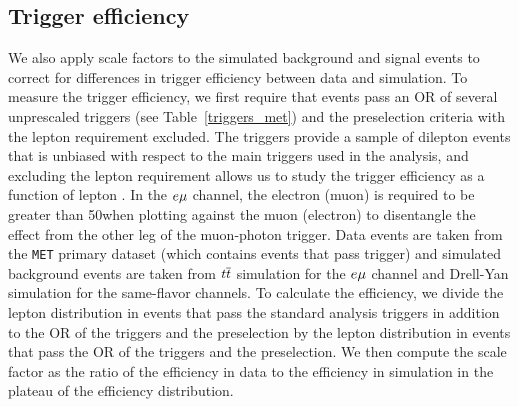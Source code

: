 \subsection{Trigger efficiency}
\label{trigger_eff}
We also apply scale factors to the simulated background and signal events to correct for differences in trigger efficiency between data and simulation. To measure the trigger efficiency, we first require that events pass an OR of several unprescaled \ptmiss triggers (see Table~\ref{triggers_met}) and the preselection criteria with the lepton \pt requirement excluded. The \ptmiss triggers provide a sample of dilepton events that is unbiased with respect to the main triggers used in the analysis, and excluding the lepton \pt requirement allows us to study the trigger efficiency as a function of lepton \pt. In the $e{\mu}$ channel, the electron (muon) \pt is required to be greater than 50\GeV when plotting against the muon (electron) \pt to disentangle the effect from the other leg of the muon-photon trigger. Data events are taken from the \texttt{MET} primary dataset (which contains events that pass \ptmiss trigger) and simulated background events are taken from $t\overline{t}$ simulation for the $e{\mu}$ channel and Drell-Yan simulation for the same-flavor channels. To calculate the efficiency, we divide the lepton \pt distribution in events that pass the standard analysis triggers in addition to the OR of the \ptmiss triggers and the preselection by the lepton \pt distribution in events that pass the OR of the \ptmiss triggers and the preselection. We then compute the scale factor as the ratio of the efficiency in data to the efficiency in simulation in the plateau of the efficiency distribution.



\pagebreak